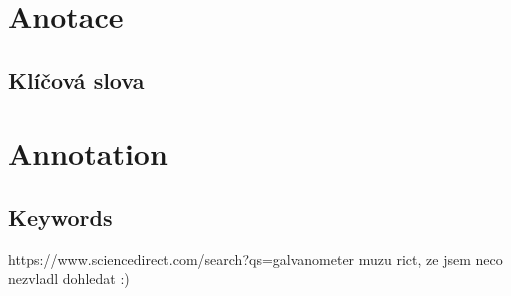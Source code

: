 \documentclass{template/socthesis}
\author{Šimon Hrouda}
\begin{document}
\newcommand{\bardgen}[3]{following text generated by ai (google bard) on #1\\%
  \begin{tcolorbox}[breakable, colback=blue!20]
    #2
  \end{tcolorbox}
  \begin{tcolorbox}[breakable, colback=blue!10, colframe=white]
    #3
  \end{tcolorbox}
}


\maketitle



\pagestyle{empty}

\section*{Anotace}


\subsection*{Klíčová slova}


\vspace{20mm}

\section*{Annotation}


\subsection*{Keywords}


\newpage
\pagestyle{plain}

\tableofcontents %

\setcounter{figure}{0}
\setcounter{table}{0}
\newpage

https://www.sciencedirect.com/search?qs=galvanometer
muzu rict, ze jsem neco nezvladl dohledat :)


\end{document}
